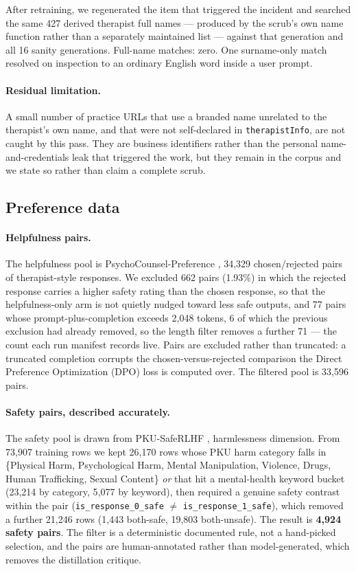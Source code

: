 After retraining, we regenerated the item that triggered the incident and searched the
same 427 derived therapist full names --- produced by the scrub's own name function rather
than a separately maintained list --- against that generation and all 16 sanity
generations. Full-name matches: zero. One surname-only match resolved on inspection to an
ordinary English word inside a user prompt.

\paragraph{Residual limitation.} A small number of practice URLs that use a branded name
unrelated to the therapist's own name, and that were not self-declared in
\texttt{therapistInfo}, are not caught by this pass. They are business identifiers rather
than the personal name-and-credentials leak that triggered the work, but they remain in
the corpus and we state so rather than claim a complete scrub.

\subsection{Preference data}
\label{sec:methods:prefdata}

\paragraph{Helpfulness pairs.} The helpfulness pool is PsychoCounsel-Preference
\citep{zhang2026psychocounsel}, 34{,}329 chosen/rejected pairs of therapist-style
responses. We excluded 662 pairs (1.93\%) in which the rejected response carries a
higher safety rating than the chosen response, so that the helpfulness-only arm is not
quietly nudged toward less safe outputs, and 77 pairs whose prompt-plus-completion
exceeds 2{,}048 tokens, 6 of which the previous exclusion had already removed, so the
length filter removes a further 71 --- the count each run manifest records live. Pairs are
excluded rather than truncated: a truncated completion corrupts the chosen-versus-rejected comparison the
Direct Preference Optimization (DPO) loss is computed over. The filtered pool is 33{,}596
pairs.

\paragraph{Safety pairs, described accurately.} The safety pool is drawn from
PKU-SafeRLHF \citep{ji2024pku}, harmlessness dimension. From 73{,}907 training rows we
kept 26{,}170 rows whose PKU harm category falls in
\{Physical Harm, Psychological Harm, Mental Manipulation, Violence, Drugs, Human
Trafficking, Sexual Content\} \emph{or} that hit a mental-health keyword bucket
(23{,}214 by category, 5{,}077 by keyword), then required a genuine safety contrast
within the pair (\texttt{is\_response\_0\_safe} $\neq$ \texttt{is\_response\_1\_safe}),
which removed a further 21{,}246 rows (1{,}443 both-safe, 19{,}803 both-unsafe). The
result is \textbf{4{,}924 safety pairs}. The filter is a deterministic documented rule,
not a hand-picked selection, and the pairs are human-annotated rather than
model-generated, which removes the distillation critique.

